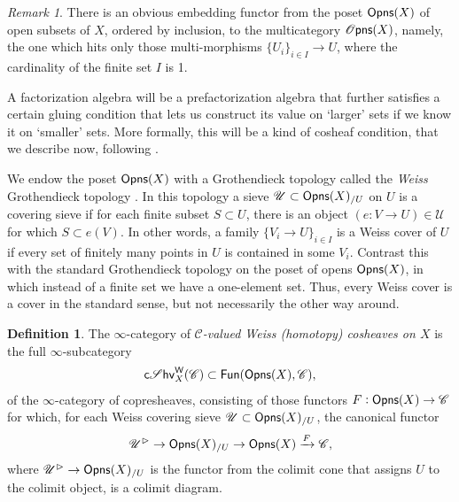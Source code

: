 \documentclass[12pt,a4paper]{article}
\newcounter{counter} \numberwithin{counter}{section}
\theoremstyle{definition}
\newtheorem{definition}[counter]{Definition}
\theoremstyle{plain}
\theoremstyle{remark}
\newtheorem{remark}[counter]{Remark}
\newcommand{\catC}{\mathscr{C}}
\newcommand{\opens}[1][s]{%
    \ifx r#1\mathsf{Opns}\else
    \ifx s#1\mathscr{O} \mathsf{pns}\else
    \mathrm{Illegal~option}%
    \fi\fi
}
\newcommand{\csheaves}{\mathsf{c} \mathscr{S} \mathsf{hv}^{\mathsf{W}}}
\begin{document}
\begin{remark}\label{rem:op_to_op}
    There is an obvious embedding functor from the poset $\opens[r](X)$ of open subsets of $X$, ordered by inclusion, to the multicategory $\opens[s](X)$, namely, the one which hits only those multi-morphisms $\{U_i\}_{i \in I} \rightarrow U$, where the cardinality of the finite set $I$ is 1.
\end{remark}


A factorization algebra will be a prefactorization algebra that further satisfies a certain gluing condition that lets us construct its value on `larger' sets if we know it on `smaller' sets. More formally, this will be a kind of cosheaf condition, that we describe now, following \cite{weiss1999,af_primer}.

We endow the poset $\opens[r](X)$ with a Grothendieck topology called the \emph{Weiss} Grothendieck topology \cite{weiss1999}. In this topology a sieve $\mathscr{U} \subset \opens[r](X)_{/U}$ on $U$ is a covering sieve if for each finite subset $S \subset U$, there is an object $(e: V \rightarrow U) \in \mathscr{U}$ for which $S \subset e(V)$. In other words, a family $\{ V_i \rightarrow U\}_{i \in I}$ is a Weiss cover of $U$ if every set of finitely many points in $U$ is contained in some $V_i$. Contrast this with the standard Grothendieck topology on the poset of opens $\opens[r](X)$, in which instead of a finite set we have a one-element set. Thus, every Weiss cover is a cover in the standard sense, but not necessarily the other way around.

\begin{definition}
    The $\infty$-category of \emph{$\catC$-valued Weiss (homotopy) cosheaves on $X$} is the full $\infty$-subcategory
    \begin{align}
        \csheaves_{X}(\catC) \subset \mathsf{Fun}(\opens[r](X), \catC),
    \end{align}
    of the $\infty$-category of copresheaves, consisting of those functors $F: \opens[r](X) \rightarrow \catC$ for which, for each Weiss covering sieve $\mathscr{U} \subset \opens[r](X)_{/U}$, the canonical functor
    \begin{align}
        \mathscr{U}^{\vartriangleright} \rightarrow \opens[r](X)_{/U} \rightarrow \opens[r](X) \xrightarrow{F} \catC,
    \end{align}
    where $\mathscr{U}^{\vartriangleright} \rightarrow \opens[r](X)_{/U}$ is the functor from the colimit cone that assigns $U$ to the colimit object, is a colimit diagram.
\end{definition}
\end{document}
